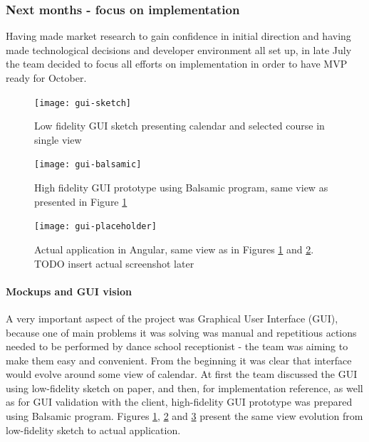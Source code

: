 \documentclass{article}
\begin{document}
\subsubsection{Next months - focus on implementation}
Having made market research to gain confidence in initial direction and having made technological decisions and developer environment all set up, in late July the team decided to focus all efforts on implementation in order to have MVP ready for October.

\begin{figure}[h]
    \texttt{[image: gui-sketch]}
    \caption{Low fidelity GUI sketch presenting calendar and selected course in single view}
    \label{fig:gui-sketch}
\end{figure}
\begin{figure}[h]
    \texttt{[image: gui-balsamic]}
    \caption{High fidelity GUI prototype using Balsamic program, same view as presented in Figure \ref{fig:gui-sketch}}
    \label{fig:gui-balsamic}
\end{figure}
\begin{figure}[h]
    \texttt{[image: gui-placeholder]}
    \caption{Actual application in Angular, same view as in Figures \ref{fig:gui-sketch} and \ref{fig:gui-balsamic}. TODO insert actual screenshot later}
    \label{fig:gui-angular}
\end{figure}

\paragraph{Mockups and GUI vision}
A very important aspect of the project was Graphical User Interface (GUI), because one of main problems it was solving was manual and repetitious actions needed to be performed by dance school receptionist - the team was aiming to make them easy and convenient. From the beginning it was clear that interface would evolve around some view of calendar. At first the team discussed the GUI using low-fidelity sketch on paper, and then, for implementation reference, as well as for GUI validation with the client, high-fidelity GUI prototype was prepared using Balsamic program. Figures \ref{fig:gui-sketch}, \ref{fig:gui-balsamic} and \ref{fig:gui-angular} present the same view evolution from low-fidelity sketch to actual application.
\end{document}
